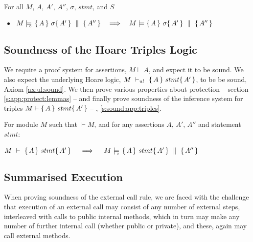 \begin{lemma}
For all $M$, $A$, $A'$, $A''$, $\sigma$, $stmt$, and $S$
\begin{itemize}
\item
 $M \models\!\!\!\!_{_{\circ}}\   \{\, A \, \}\ \sigma \{\, A' \, \} \, \,\parallel\,\, \{\, A'' \, \}    \ \ \ \Longrightarrow \ \ \   M \models  \{\, A \, \}\ \sigma \{\, A' \, \} \, \,\parallel\,\, \{\, A'' \, \} $

\end{itemize}
\end{lemma}


\subsection{Soundness of the Hoare Triples Logic}
\label{sect:prove:triples:sound}

We require a  proof system for assertions, $M\vdash A$, and expect it to be sound.
We also expect  the    underlying Hoare logic,  $M\ \vdash_{ul}\   \{\, A \, \}\ stmt \{\, A' \, \}$,   to be be  sound, \cf Axiom \ref{ax:ul:sound}.
We then prove various properties about protection -- \cf section \ref{s:app:protect:lemmas} --  and finally prove 
 soundness of the inference system for triples $M \vdash   \{\, A \, \}\ stmt \{\, A' \, \} $ -- \cf \A, \ref{s:sound:app:triples}.

 

\begin{Theorem}
\label{l:triples:sound}
For module  $M$   such that  $\vdash M$, and for any assertions $A$,  $A'$, $A''$ and statement  $stmt$:
\begin{center}
$M\ \vdash\  \triple A {stmt} {A'}  \ \ \ \  \Longrightarrow  \ \ \ \ \satisfiesD {M} {\quadruple {A} {stmt} {A'} {A''}}$
\end{center}
\end{Theorem}
 

\subsection{Summarised Execution}
\label{s:summaized}

When proving soundness of the external call rule, we are faced with the challenge that
execution of an external call may consist of any number of external
steps, interleaved with calls to public internal methods, which in
turn may make any number of further internal call (whether public or private), and these, again may call external methods.
 


